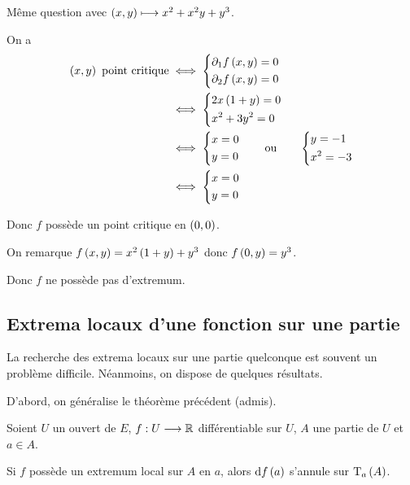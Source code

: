 \begin{exo}
Même question avec \(\left(x,y\right)\longmapsto x^2+x^2y+y^3\).
\end{exo}

\begin{corr}
On a \[\begin{aligned}
\paren{x,y}\text{ point critique}&\ssi\begin{dcases}
\pdif{1}f\paren{x,y}=0 \\
\pdif{2}f\paren{x,y}=0
\end{dcases} \\
&\ssi\begin{dcases}
2x\paren{1+y}=0 \\
x^2+3y^2=0
\end{dcases} \\
&\ssi\begin{dcases}
x=0 \\
y=0
\end{dcases}\qquad\text{ou}\qquad\begin{dcases}
y=-1 \\
x^2=-3
\end{dcases} \\
&\ssi\begin{dcases}
x=0 \\
y=0
\end{dcases}
\end{aligned}\]

Donc \(f\) possède un point critique en \(\left(0,0\right)\).

On remarque \(f\left(x,y\right)=x^2\left(1+y\right)+y^3\) donc \(f\left(0,y\right)=y^3\).

Donc \(f\) ne possède pas d'extremum.
\end{corr}

\subsection{Extrema locaux d'une fonction sur une partie}

La recherche des extrema locaux sur une partie quelconque est souvent un problème difficile. Néanmoins, on dispose de quelques résultats.

D'abord, on généralise le théorème précédent (admis).

\begin{prop}
Soient \(U\) un ouvert de \(E\), \(f:U\longrightarrow\mathbb{R}\) différentiable sur \(U\), \(A\) une partie de \(U\) et \(a\in A\).

Si \(f\) possède un extremum local sur \(A\) en \(a\), alors \(\odif{f}\paren{a}\) s'annule sur \(\operatorname{T}_{a}\left(A\right)\).
\end{prop}

